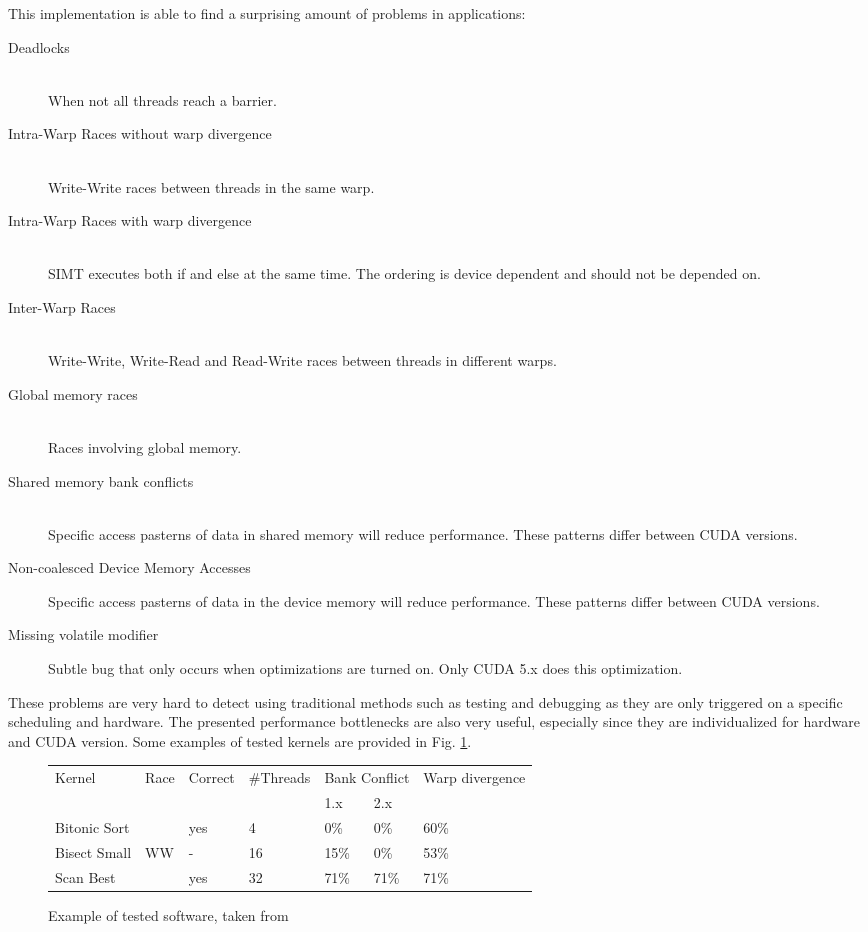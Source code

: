 \documentclass[10pt]{llncs}
\begin{document}
This implementation is able to find a surprising amount of problems in applications:

\begin{description}
	\item[Deadlocks] \hfill \\
		When not all threads reach a barrier.
	\item[Intra-Warp Races without warp divergence]  \hfill \\
		Write-Write races between threads in the same warp.
	\item[Intra-Warp Races with warp divergence] \hfill \\
		SIMT executes both if and else at the same time. The ordering is device dependent and should not be depended on.
	\item[Inter-Warp Races] \hfill \\
		Write-Write, Write-Read and Read-Write races between threads in different warps.
	\item[Global memory races] \hfill \\
		Races involving global memory.
	\item[Shared memory bank conflicts] \hfill \\
		Specific access pasterns of data in shared memory will reduce performance. These patterns differ between CUDA versions.
	\item[Non-coalesced Device Memory Accesses]
		Specific access pasterns of data in the device memory will reduce performance. These patterns differ between CUDA versions.
	\item[Missing volatile modifier]
		Subtle bug that only occurs when optimizations are turned on. Only CUDA 5.x does this optimization.
\end{description}

These problems are very hard to detect using traditional methods such as testing and debugging as they are only triggered on a specific scheduling and hardware. The presented performance bottlenecks are also very useful, especially since they are individualized for hardware and CUDA version.  Some examples of tested kernels are provided in Fig. \ref{example:7}.

\begin{figure}
	\centering
	
	\begin{tabular}{l l l l l l l}
		Kernel & Race & Correct & \#Threads & \multicolumn{2}{c}{Bank Conflict} & Warp divergence\\
		& & & & 1.x & 2.x & \\
		\hline
		
		Bitonic Sort & & yes & 4 & 0\% & 0\% & 60\% \\
		Bisect Small & WW & - & 16 & 15\% & 0\% & 53\% \\
		Scan Best & & yes & 32 & 71\% & 71\% & 71\%
	\end{tabular}
	
	\caption{Example of tested software, taken from \cite{base7}}
	\label{example:7}
\end{figure}
\end{document}
